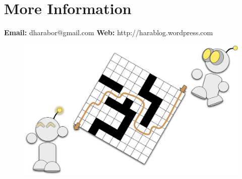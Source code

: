 
\section{More Information}
\textbf{Email:} dharabor@gmail.com
\newline \newline
\textbf{Web: } http://harablog.wordpress.com
\newline \newline


\vspace{1em}
 \begin{figure}[h]
 \centering
		\includegraphics[width=1.02\columnwidth]{diagrams/robot_splash.pdf}
 \end{figure}


